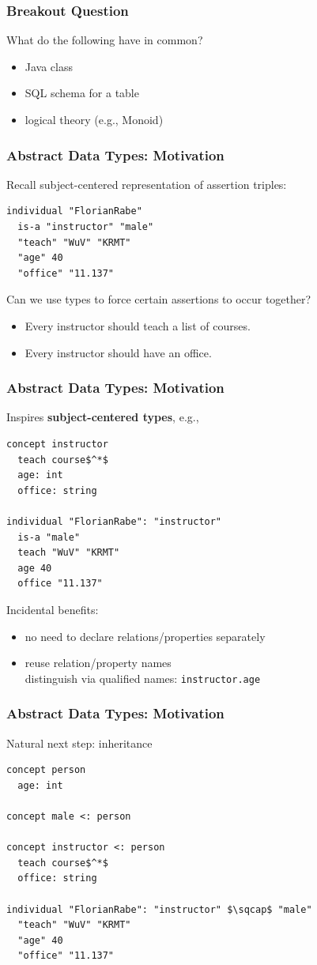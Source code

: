 \documentclass{beamer}
\begin{document}
\begin{frame}\frametitle{Breakout Question}
What do the following have in common?
\begin{itemize}
\item Java class
\item SQL schema for a table
\item logical theory (e.g., Monoid)
\end{itemize}
\end{frame}

\begin{frame}[fragile]\frametitle{Abstract Data Types: Motivation}
Recall subject-centered representation of assertion triples:

\begin{lstlisting}
individual "FlorianRabe"
  is-a "instructor" "male"
  "teach" "WuV" "KRMT"
  "age" 40
  "office" "11.137"
\end{lstlisting}

Can we use types to force certain assertions to occur together?
\begin{itemize}
\item Every instructor should teach a list of courses.
\item Every instructor should have an office.
\end{itemize}
\end{frame}

\begin{frame}[fragile]\frametitle{Abstract Data Types: Motivation}
Inspires \textbf{subject-centered types}, e.g.,

\begin{lstlisting}
concept instructor
  teach course$^*$
  age: int
  office: string

individual "FlorianRabe": "instructor"
  is-a "male"
  teach "WuV" "KRMT"
  age 40
  office "11.137"
\end{lstlisting}

Incidental benefits:
\begin{itemize}
\item no need to declare relations/properties separately
\item reuse relation/property names \\ distinguish via qualified names: \lstinline|instructor.age|
\end{itemize}
\end{frame}

\begin{frame}[fragile]\frametitle{Abstract Data Types: Motivation}
Natural next step: inheritance

\begin{lstlisting}
concept person
  age: int
  
concept male <: person

concept instructor <: person
  teach course$^*$
  office: string

individual "FlorianRabe": "instructor" $\sqcap$ "male"
  "teach" "WuV" "KRMT"
  "age" 40
  "office" "11.137"
\end{lstlisting}

\end{frame}
\end{document}

